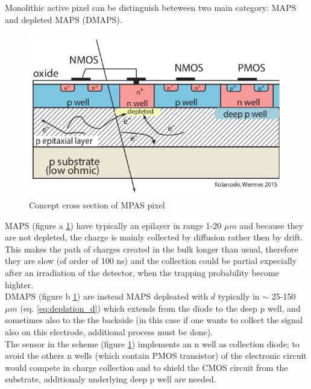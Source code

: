    Monolithic active pixel can be distinguish beteween two main category: MAPS and depleted MAPS (DMAPS).
   \begin{figure}
      \centering
      \includegraphics[width=.4\linewidth]{figures/Pixel_detectors/MAPS_scheme.png}
      \caption{Concept cross section of MPAS pixel}
      \label{fig:MAPS_scheme}
   \end{figure}

   MAPS (figure a \ref{fig:MAPS_scheme}) have typically an epilayer in range 1-20 $\mu m$ and because they are not depleted, the charge is mainly collected by diffusion rather then by drift. This makes the path of charges created in the bulk longer than usual, therefore they are slow (of order of 100 ns) and the collection could be partial expecially after an irradiation of the detector, when the trapping probability become highter. \\
   DMAPS (figure b \ref{fig:MAPS_scheme}) are instead MAPS depleated with $d$ typically in $\sim$ 25-150 $\mu m$ (eq. \ref{eq:deplation_d}) which extends from the diode to the deep p well, and sometimes also to the the backside (in this case if one wants to collect the signal also on this electrode, additional process must be done).\\
   The sensor in the scheme  (figure \ref{fig:MAPS_scheme}) implements an n well as  collection diode; to avoid the others n wells (which contain PMOS transistor) of the electronic circuit would compete in charge collection and to shield the CMOS circuit from the substrate, additionaly underlying deep p well are needed.

